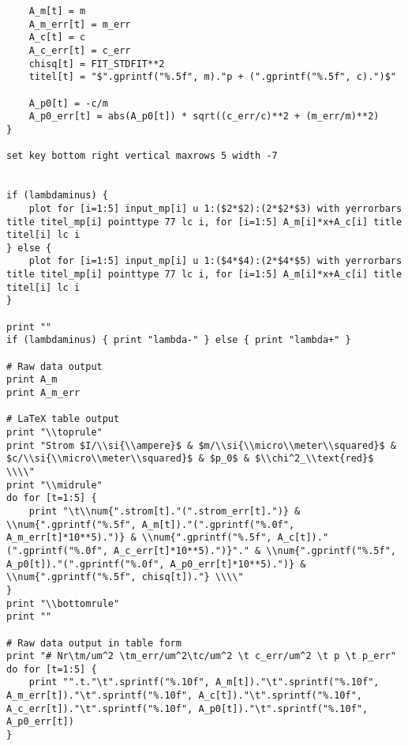 {\begin{verbatim}
    A_m[t] = m
    A_m_err[t] = m_err
    A_c[t] = c
    A_c_err[t] = c_err
    chisq[t] = FIT_STDFIT**2
    titel[t] = "$".gprintf("%.5f", m)."p + (".gprintf("%.5f", c).")$"

    A_p0[t] = -c/m
    A_p0_err[t] = abs(A_p0[t]) * sqrt((c_err/c)**2 + (m_err/m)**2)
}

set key bottom right vertical maxrows 5 width -7


if (lambdaminus) {
    plot for [i=1:5] input_mp[i] u 1:($2*$2):(2*$2*$3) with yerrorbars title titel_mp[i] pointtype 77 lc i, for [i=1:5] A_m[i]*x+A_c[i] title titel[i] lc i
} else {
    plot for [i=1:5] input_mp[i] u 1:($4*$4):(2*$4*$5) with yerrorbars title titel_mp[i] pointtype 77 lc i, for [i=1:5] A_m[i]*x+A_c[i] title titel[i] lc i
}

print ""
if (lambdaminus) { print "lambda-" } else { print "lambda+" }

# Raw data output
print A_m
print A_m_err

# LaTeX table output
print "\\toprule"
print "Strom $I/\\si{\\ampere}$ & $m/\\si{\\micro\\meter\\squared}$ & $c/\\si{\\micro\\meter\\squared}$ & $p_0$ & $\\chi^2_\\text{red}$ \\\\"
print "\\midrule"
do for [t=1:5] {
    print "\t\\num{".strom[t]."(".strom_err[t].")} & \\num{".gprintf("%.5f", A_m[t])."(".gprintf("%.0f", A_m_err[t]*10**5).")} & \\num{".gprintf("%.5f", A_c[t])."(".gprintf("%.0f", A_c_err[t]*10**5).")}"." & \\num{".gprintf("%.5f", A_p0[t])."(".gprintf("%.0f", A_p0_err[t]*10**5).")} & \\num{".gprintf("%.5f", chisq[t])."} \\\\"
}
print "\\bottomrule"
print ""

# Raw data output in table form
print "# Nr\tm/um^2 \tm_err/um^2\tc/um^2 \t c_err/um^2 \t p \t p_err"
do for [t=1:5] {
    print "".t."\t".sprintf("%.10f", A_m[t])."\t".sprintf("%.10f", A_m_err[t])."\t".sprintf("%.10f", A_c[t])."\t".sprintf("%.10f", A_c_err[t])."\t".sprintf("%.10f", A_p0[t])."\t".sprintf("%.10f", A_p0_err[t])
}
        \end{verbatim}
    }

